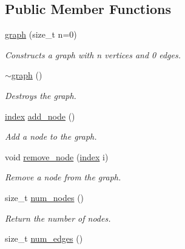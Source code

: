 \subsection*{Public Member Functions}
\begin{DoxyCompactItemize}
\item 
\hyperlink{classmerlin_1_1graph_aa01a823270b0fb2edbc2cd6622e961fe}{graph} (size\+\_\+t n=0)
\begin{DoxyCompactList}\small\item\em Constructs a graph with {\itshape n} vertices and 0 edges. \end{DoxyCompactList}\item 
\hyperlink{classmerlin_1_1graph_a6c24adfdbf5091e0adea5c2bf551debc}{$\sim$graph} ()\hypertarget{classmerlin_1_1graph_a6c24adfdbf5091e0adea5c2bf551debc}{}\label{classmerlin_1_1graph_a6c24adfdbf5091e0adea5c2bf551debc}

\begin{DoxyCompactList}\small\item\em Destroys the graph. \end{DoxyCompactList}\item 
\hyperlink{classmerlin_1_1graph_a5cade38832f47248573e921276f122d6}{index} \hyperlink{classmerlin_1_1graph_a844faa05514a364e89c53cef10e59a9b}{add\+\_\+node} ()
\begin{DoxyCompactList}\small\item\em Add a node to the graph. \end{DoxyCompactList}\item 
void \hyperlink{classmerlin_1_1graph_a33a6ba0779fcd5a432eb0e9fade5113e}{remove\+\_\+node} (\hyperlink{classmerlin_1_1graph_a5cade38832f47248573e921276f122d6}{index} i)
\begin{DoxyCompactList}\small\item\em Remove a node from the graph. \end{DoxyCompactList}\item 
size\+\_\+t \hyperlink{classmerlin_1_1graph_a068fcb26500eccd201a6ca877d76fafe}{num\+\_\+nodes} ()\hypertarget{classmerlin_1_1graph_a068fcb26500eccd201a6ca877d76fafe}{}\label{classmerlin_1_1graph_a068fcb26500eccd201a6ca877d76fafe}

\begin{DoxyCompactList}\small\item\em Return the number of nodes. \end{DoxyCompactList}\item 
size\+\_\+t \hyperlink{classmerlin_1_1graph_a2d2debc5137f505ce83009067d125b5d}{num\+\_\+edges} ()\hypertarget{classmerlin_1_1graph_a2d2debc5137f505ce83009067d125b5d}{}\label{classmerlin_1_1graph_a2d2debc5137f505ce83009067d125b5d}


\end{DoxyCompactItemize}
